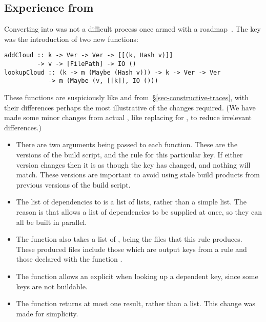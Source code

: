\subsection{Experience from \Cloud \Shake}\label{sec-cloud-shake}

Converting \Shake into \Cloud \Shake was not a difficult process once armed with
a roadmap~\cite{mokhov2018buildsystems}. The key was the introduction of two new
functions:

\vspace{1mm}
\begin{verbatim}
addCloud :: k -> Ver -> Ver -> [[(k, Hash v)]]
         -> v -> [FilePath] -> IO ()
lookupCloud :: (k -> m (Maybe (Hash v))) -> k -> Ver -> Ver
            -> m (Maybe (v, [[k]], IO ()))
\end{verbatim}
\vspace{1mm}

\noindent
These functions are suspiciously like  and 
from~\S\ref{sec-constructive-traces}, with their differences perhaps the most
illustrative of the changes required. (We have made some minor changes from
actual \Shake, like replacing  for , to reduce irrelevant
differences.)

\begin{itemize}
\item There are two  arguments being passed to each function. These are
      the versions of the build script, and the rule for this particular key. If
      either version changes then it is as though the key has changed, and
      nothing will match. These versions are important to avoid using stale
      build products from previous versions of the build script.
\item The list of dependencies to  is a list of lists, rather than
      a simple list. The reason is that \Shake allows a list of dependencies to
      be supplied at once, so they can all be built in parallel.
\item The  function also takes a list of , being the
      files that this rule produces. These produced files include those which
      are output keys from a rule and those declared with the function
      .
\item The  function allows an explicit  when looking
      up a dependent key, since some keys are not buildable.
\item The  function returns at most one result, rather than a
      list. This change was made for simplicity.
\end{itemize}


